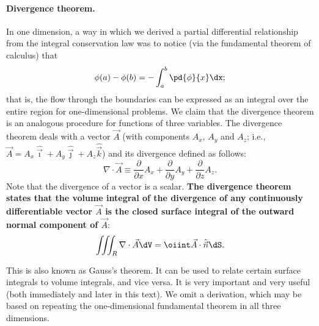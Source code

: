 \paragraph{Divergence theorem.}
In one dimension, a way in which we derived a partial differential relationship from the integral conservation law was to notice (via the fundamental theorem of calculus) that
\[
\phi(a) - \phi(b) = -\int_a^b \pd{\phi}{x}\dx;
\]
that is, the flow through the boundaries can be expressed as an integral over the entire region for one-dimensional problems. We claim that the divergence theorem is an analogous procedure for functions of three variables. The divergence theorem deals with a vector $\vec{A}$ (with components $A_x$, $A_y$ and $A_z$; i.e., $\vec{A} = A_x\hat{\vec{\imath}} + A_y\hat{\vec{\jmath}} + A_z\hat{\vec{k}}$) and its divergence defined as follows:
\begin{equation}
\nabla\cdot\vec{A} \equiv \frac{\partial}{\partial x}A_x + \frac{\partial}{\partial y}A_y + \frac{\partial}{\partial z}A_z.
\label{eq:1.5.2}
\end{equation}
Note that the divergence of a vector is a scalar. \textbf{The divergence theorem states that the volume integral of the divergence of any continuously differentiable vector $\vec{A}$ is the closed surface integral of the outward normal component of $\vec{A}$}:
\begin{equation}
\iiint_R \nabla\cdot\vec{A}\dV = \oiint \vec{A}\cdot\hat{\vec{n}}\dS.
\label{eq:1.5.3}
\end{equation}

This is also known as Gauss's theorem. It can be used to relate certain surface integrals to volume integrals, and vice versa. It is very important and very useful (both immediately and later in this text). We omit a derivation, which may be based on repeating the one-dimensional fundamental theorem in all three dimensions.


